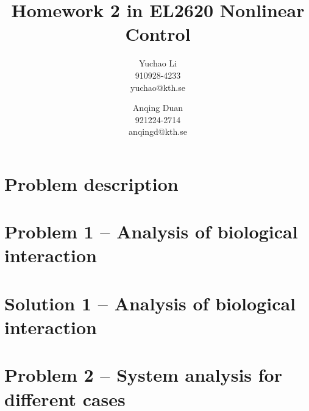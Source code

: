 \documentclass[a4paper,twocolumn]{article} %
\begin{document}

\title{Homework 2 in EL2620 Nonlinear Control}
\author{Yuchao Li \\ 910928-4233 \\ yuchao@kth.se \and Anqing Duan\\
  921224-2714 \\ anqingd@kth.se}

\maketitle                     %





\section*{Problem description}
\label{sec:prob}




\section*{Problem 1 -- Analysis of biological interaction}
\label{sec:pro1}



\section*{Solution 1 -- Analysis of biological interaction}
\label{sec:sol1}



\section*{Problem 2 -- System analysis for different cases}
\label{sec:prob2}


\end{document}

